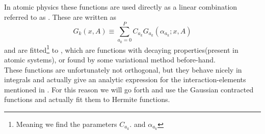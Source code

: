     In atomic physics these functions are used directly as a linear combination
    referred to as . These are written as
        \begin{equation}
            G_k(x, A) \equiv \sum\limits^P_{a_k=0} C_{a_k}
            G_{a_k}(\alpha_{a_k};x, A)
        \end{equation}
    and are fitted\footnote{Meaning we find the parameters $C_{a_k}.$ and
    $\alpha_{a_k}$} to , which are functions with
    decaying properties(present in atomic systems), or found by some variational
    method before-hand. \\

    These functions are unfortunately not orthogonal, but they behave nicely in
    integrals and actually give an analytic expression for the
    interaction-elements mentioned in . For this reason we
    will go forth and use the Gaussian contracted functions and actually fit
    them to Hermite functions.


